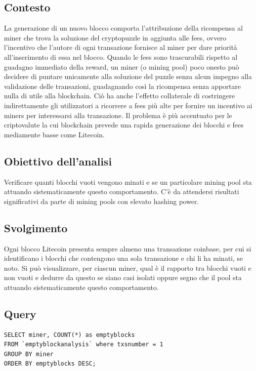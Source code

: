 \subsection{Contesto}
La generazione di un nuovo blocco comporta l’attribuzione della ricompensa al miner che trova la soluzione del cryptopuzzle in aggiunta alle fees, ovvero l’incentivo che l’autore di ogni transazione fornisce al miner per dare priorità all’inserimento di essa nel blocco.
Quando le fees sono trascurabili rispetto al guadagno immediato della reward, un miner (o mining pool) poco onesto può decidere di puntare unicamente alla soluzione del puzzle senza alcun impegno alla validazione delle transazioni, guadagnando così la ricompensa senza apportare nulla di utile alla blockchain. Ciò ha anche l’effetto collaterale di costringere indirettamente gli utilizzatori a ricorrere a fees più alte per fornire un incentivo ai miners per interessarsi alla transazione.
Il problema è più accentuato per le criptovalute la cui blockchain prevede una rapida generazione dei blocchi e fees mediamente basse come Litecoin.

\subsection{Obiettivo dell’analisi}
Verificare quanti blocchi vuoti vengono minati e se un particolare mining pool sta attuando sistematicamente questo comportamento.
C’è da attendersi risultati significativi da parte di mining pools con elevato hashing power.

\subsection{Svolgimento}
Ogni blocco Litecoin presenta sempre almeno una transazione coinbase, per cui si identificano i blocchi che contengono una sola transazione e chi li ha minati, se noto. Si può visualizzare, per ciascun miner, qual è il rapporto tra blocchi vuoti e non vuoti e dedurre da questo se siano casi isolati oppure segno che il pool sta attuando sistematicamente questo comportamento.

\subsection{Query}

\begin{lstlisting}
SELECT miner, COUNT(*) as emptyblocks 
FROM `emptyblockanalysis` where txsnumber = 1
GROUP BY miner
ORDER BY emptyblocks DESC;
\end{lstlisting}


